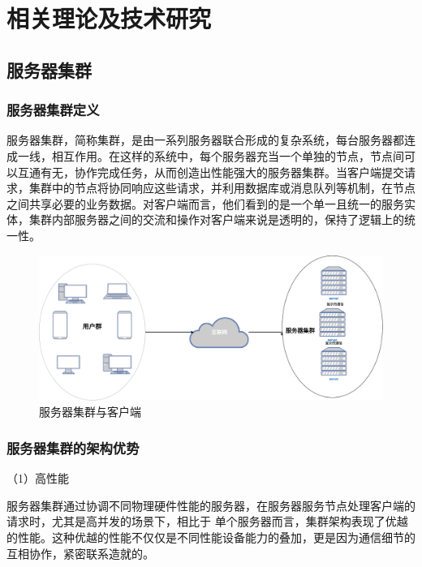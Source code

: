 \chapter{相关理论及技术研究}

\section{服务器集群}

\subsection{服务器集群定义}

服务器集群，简称集群，是由一系列服务器联合形成的复杂系统，每台服务器都连成一线，相互作用。在这样的系统中，每个服务器充当一个单独的节点，节点间可以互通有无，协作完成任务，从而创造出性能强大的服务器集群。当客户端提交请求，集群中的节点将协同响应这些请求，并利用数据库或消息队列等机制，在节点之间共享必要的业务数据。对客户端而言，他们看到的是一个单一且统一的服务实体，集群内部服务器之间的交流和操作对客户端来说是透明的，保持了逻辑上的统一性。
\begin{figure}[ht]
	\centering
	\includegraphics[width=\textwidth]{figures/cluster-and-client.png}
	\caption{服务器集群与客户端}
\end{figure}

\subsection{服务器集群的架构优势}

（1）高性能

服务器集群通过协调不同物理硬件性能的服务器，在服务器服务节点处理客户端的请求时，尤其是高并发的场景下，相比于
单个服务器而言，集群架构表现了优越的性能。这种优越的性能不仅仅是不同性能设备能力的叠加，更是因为通信细节的互相协作，紧密联系造就的。

